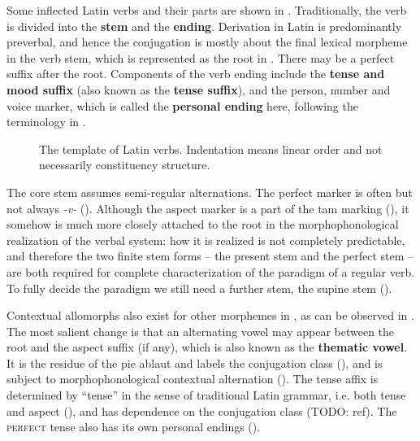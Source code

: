 \documentclass[a4paper, oneside, 12pt]{report}
\newcommand*{\citesec}[1]{\S~{#1}}
\newcommand*{\citepage}[1]{p.~{#1}}
\newcommand*{\concept}[1]{\textbf{#1}}
\newcommand{\form}[1]{\emph{#1}}
\newcommand*{\category}[1]{\textsc{#1}}
\begin{document}
Some inflected Latin verbs and their parts are shown in .
Traditionally, the verb is divided 
into the \concept{stem} and the \concept{ending}.
Derivation in Latin is predominantly preverbal,
and hence the conjugation is mostly about the final lexical morpheme in the verb stem,
which is represented as the root in .
There may be a perfect suffix after the root.
Components of the verb ending include 
the \concept{tense and mood suffix} (also known as the \concept{tense suffix}),
and the person, number and voice marker,
which is called the \concept{personal ending} here, 
following the terminology in \citet[\citesec{165}]{allen1903allen}.

\begin{figure}[H]
    \centering
    
    \caption{The template of Latin verbs.
    Indentation means linear order and not necessarily constituency structure.}
    \label{fig:latin-verb}
\end{figure}

The core stem assumes semi-regular alternations.
The perfect marker is often but not always \form{-v-} ().
Although the aspect marker is a part of the \acs{tam} marking
(),
it somehow is much more closely attached to the root 
in the morphophonological realization of the verbal system:
how it is realized is not completely predictable,
and therefore the two finite stem forms -- 
the present stem and the perfect stem -- 
are both required for complete characterization of the paradigm of a regular verb.
To fully decide the paradigm 
we still need a further stem, the supine stem
().

Contextual allomorphs also exist for other morphemes in 
\citep[\citepage{11}]{embick2005status},
as can be observed in .
The most salient change is that 
an alternating vowel may appear between the root and the aspect suffix (if any),
which is also known as the \concept{thematic vowel}.
It is the residue of the \ac{pie} ablaut
and labels the conjugation class
(),
and is subject to morphophonological contextual alternation
().
The tense affix is determined by ``tense'' in the sense of traditional Latin grammar, 
i.e. both tense and aspect (),
and has dependence on the conjugation class (TODO: ref).
The \category{perfect} tense also has its own personal endings ().
\end{document}
